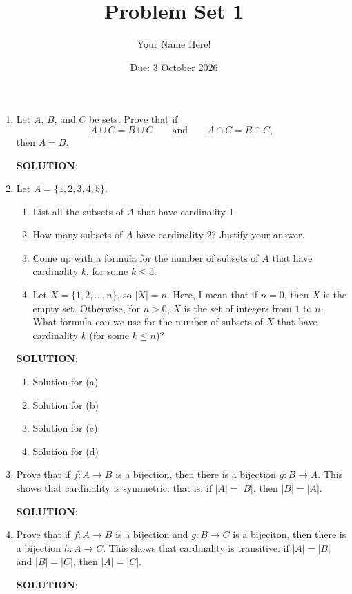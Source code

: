 \documentclass[12pt]{article}
\title{Problem Set 1}
\author{Your Name Here!}
\date{Due: 3 October 2026}
\newcommand{\sol}{\par{\bf SOLUTION}: }
\theoremstyle{plain}
\theoremstyle{definition}
\begin{document}
	
	\maketitle

\begin{enumerate}

\item Let $A$, $B$, and $C$ be sets. Prove that if
\[
A\cup C=B\cup C
\qquad\text{and}\qquad
A\cap C=B\cap C,
\]
then $A=B$.

\sol %

\item Let $A = \{ 1, 2, 3, 4, 5 \}$.
\begin{enumerate}
\item List all the subsets of $A$ that have cardinality 1.
\item How many subsets of $A$ have cardinality 2? Justify your answer.
\item Come up with a formula for the number of subsets of $A$ that have cardinality $k$, for some $k \leq 5$.
\item Let $X = \{ 1, 2, \ldots, n \}$, so $|X| = n$. Here, I mean that if $n = 0$, then $X$ is the empty set. Otherwise, for $n > 0$, $X$ is the set of integers from $1$ to $n$. What formula can we use for the number of subsets of $X$ that have cardinality $k$ (for some $k \leq n$)?
\end{enumerate}

\sol
\begin{enumerate}
	\item Solution for (a)
	\item Solution for (b)
	\item Solution for (c)
	\item Solution for (d)
\end{enumerate}

\item Prove that if $f : A \to B$ is a bijection, then there is a bijection $g : B \to A$. This shows that cardinality is symmetric: that is, if $|A| = |B|$, then $|B| = |A|$.

\sol %

\item Prove that if $f : A \to B$ is a bijection and $g : B \to C$ is a bijeciton, then there is a bijection $h : A \to C$. This shows that cardinality is transitive: if $|A| = |B|$ and $|B| = |C|$, then $|A| = |C|$.

\sol %


\end{enumerate}
\end{document}
